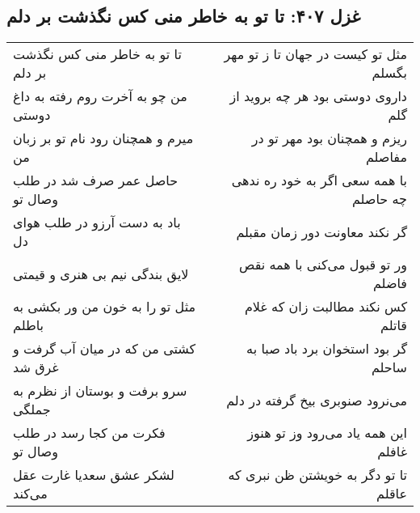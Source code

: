 \begin{center}
\section*{غزل ۴۰۷: تا تو به خاطر منی کس نگذشت بر دلم}
\label{sec:407}
\begin{longtable}{l p{0.5cm} r}
تا تو به خاطر منی کس نگذشت بر دلم
&&
مثل تو کیست در جهان تا ز تو مهر بگسلم
\\
من چو به آخرت روم رفته به داغ دوستی
&&
داروی دوستی بود هر چه بروید از گلم
\\
میرم و همچنان رود نام تو بر زبان من
&&
ریزم و همچنان بود مهر تو در مفاصلم
\\
حاصل عمر صرف شد در طلب وصال تو
&&
با همه سعی اگر به خود ره ندهی چه حاصلم
\\
باد به دست آرزو در طلب هوای دل
&&
گر نکند معاونت دور زمان مقبلم
\\
لایق بندگی نیم بی هنری و قیمتی
&&
ور تو قبول می‌کنی با همه نقص فاضلم
\\
مثل تو را به خون من ور بکشی به باطلم
&&
کس نکند مطالبت زان که غلام قاتلم
\\
کشتی من که در میان آب گرفت و غرق شد
&&
گر بود استخوان برد باد صبا به ساحلم
\\
سرو برفت و بوستان از نظرم به جملگی
&&
می‌نرود صنوبری بیخ گرفته در دلم
\\
فکرت من کجا رسد در طلب وصال تو
&&
این همه یاد می‌رود وز تو هنوز غافلم
\\
لشکر عشق سعدیا غارت عقل می‌کند
&&
تا تو دگر به خویشتن ظن نبری که عاقلم
\\
\end{longtable}
\end{center}
